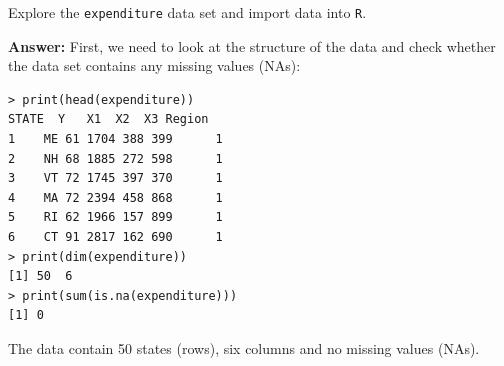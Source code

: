 \documentclass[12pt,letterpaper]{article}
\begin{document}
\vspace{.5cm}
\noindent Explore the \texttt{expenditure} data set and import data into  \texttt{R}. %
\vspace{.5cm}
  

\noindent \textbf{Answer:} First, we need to look at the structure of the data and check whether the data set contains any missing values (NAs):



\begin{verbatim}
> print(head(expenditure))
STATE  Y   X1  X2  X3 Region
1    ME 61 1704 388 399      1
2    NH 68 1885 272 598      1
3    VT 72 1745 397 370      1
4    MA 72 2394 458 868      1
5    RI 62 1966 157 899      1
6    CT 91 2817 162 690      1
> print(dim(expenditure))
[1] 50  6
> print(sum(is.na(expenditure)))
[1] 0
\end{verbatim}

\noindent The data contain 50 states (rows), six columns and no missing values (NAs).
\end{document}
